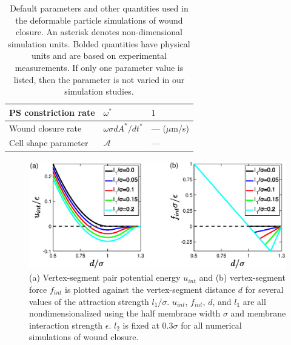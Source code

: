 \documentclass[%
 reprint,
superscriptaddress,
 amsmath,amssymb,
pre,
]{revtex4-2}
\begin{document}
\begin{table}[t]
\begin{tabularx}{\textwidth}{|X|X|X|}
    \hline
    PS constriction rate & $\omega^*$ & $1$ \\ 
    \hline
    Wound closure rate & $\omega \sigma dA^*/dt^*$ & --- ($\mu$m/s)\\ 
    \hline
    Cell shape parameter & $\mathcal{A}$ & ---\\ 
    \hline
  \end{tabularx}
  \caption{Default parameters and other quantities used in the deformable particle simulations of wound closure. An asterisk denotes non-dimensional simulation units. Bolded quantities have physical units and are based on experimental measurements. If only one parameter value is listed, then the parameter is not varied in our simulation studies. }
  \label{tab:defaultParams}
\end{table}

\begin{figure}
    \centering
    \includegraphics[width=\linewidth]{suppFigures/SuppFigPotential.eps}
\caption{(a) Vertex-segment pair potential energy $u_{int}$ and (b) vertex-segment force $f_{int}$ is plotted against the vertex-segment distance $d$ for several values of the attraction strength $l_1/\sigma$. $u_{int}$, $f_{int}$, $d$, and $l_1$ are all nondimensionalized using the half membrane width $\sigma$ and membrane interaction strength $\epsilon$. $l_2$ is fixed at $0.3\sigma$ for all numerical simulations of wound closure.  
}
\label{suppfig:potential}
\end{figure}
\end{document}
